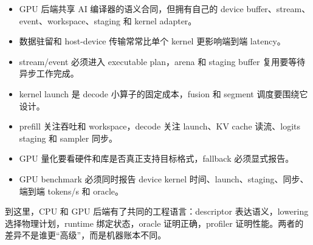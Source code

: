 \begin{itemize}
  \item GPU 后端共享 AI 编译器的语义合同，但拥有自己的 device buffer、stream、event、workspace、staging 和 kernel adapter。
  \item 数据驻留和 host-device 传输常常比单个 kernel 更影响端到端 latency。
  \item stream/event 必须进入 executable plan，arena 和 staging buffer 复用要等待异步工作完成。
  \item kernel launch 是 decode 小算子的固定成本，fusion 和 segment 调度要围绕它设计。
  \item prefill 关注吞吐和 workspace，decode 关注 launch、KV cache 读流、logits staging 和 sampler 同步。
  \item GPU 量化要看硬件和库是否真正支持目标格式，fallback 必须显式报告。
  \item GPU benchmark 必须同时报告 device kernel 时间、launch、staging、同步、端到端 tokens/s 和 oracle。
\end{itemize}

到这里，CPU 和 GPU 后端有了共同的工程语言：descriptor 表达语义，lowering 选择物理计划，runtime 绑定状态，oracle 证明正确，profiler 证明性能。两者的差异不是谁更“高级”，而是机器账本不同。
